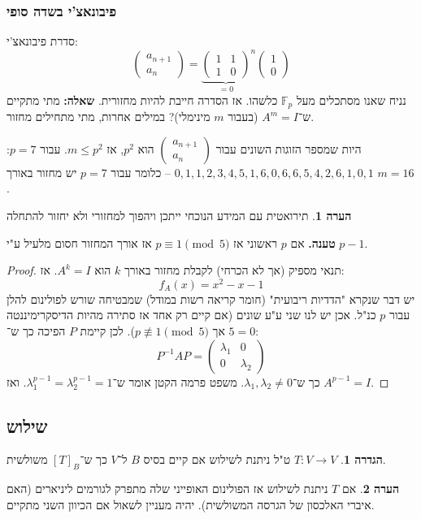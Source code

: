 \documentclass[a4paper]{article}
\newcommand\F         {\mathbb{F}}
\newcommand\co        {\colon}
\newcommand\pms[1]    {\begin{pmatrix}
		#1
\end{pmatrix}}
\renewcommand\lg      {\lambda}
\newcommand\op    {^{-1}}
\theoremstyle{definition}
\newtheorem{definition}{הגדרה}
\newtheorem{Remark}{הערה}
\newcommand\defi  [1] {\begin{definition}#1\end{definition}}
\newcommand\rmark [1] {\begin{Remark}#1\end{Remark}}
\begin{document}
	\subsubsection{פיבונאצ'י בשדה סופי}
	סדרת פיבונאצ'י: 
	\[ \pms{a_{n + 1} \\ a_n} = {\underbrace{\pms{1 & 1 \\ 1 & 0}}_{ = 0}}^{n}\pms{1 \\ 0} \]
	נניח שאנו מסתכלים מעל $\F_p$ כלשהו. אז הסדרה חייבת להיות מחזורית. \textbf{שאלה: }מתי מתקיים ש־$A^m = I$ (בעבור $m$ מינימלי)? במילים אחרות, מתי מתחילים מחזור. 
	
	היות שמספר הזוגות השונים עבור $\pms{a_{n + 1} \\ a_n}$ הוא $p^2$, אז $m \le p^2$. עבור $p = 7$: \hfill $0, 1, 1, 2, 3, 4, 5, 1, 6, 0, 6, 6, 5, 4, 2, 6, 1, 0, 1$ – כלומר עבור $p = 7$ יש מחזור באורך $m = 16$.
	\rmark{תירואטית עם המידע הנוכחי ייתכן ויהפוך למחזורי ולא יחזור להתחלה}
	
	\textbf{טענה. }אם $p$ ראשוני אז $p \equiv 1 \pmod 5$ אז אורך המחזור חסום מלעיל ע"י $p - 1$. 
	
	\begin{proof}
		תנאי מספיק (אך לא הכרחי) לקבלת מחזור באורך $k$ הוא $A^k = I$. אז: 
		\[ f_A(x) = x^2 - x - 1 \]
		יש דבר שנקרא "הדדיות ריבועית" (חומר קריאה רשות במודל) שמבטיחה שורש לפולינום להלן עבור $p$ כנ"ל. אכן יש לנו שני ע"ע שונים (אם קיים רק אחד אז סתירה מהיות הדיסקרימיננטה $5 = 0$ אך $p \not\equiv 1 \pmod 5$). לכן קיימת $P$ הפיכה כך ש־: 
		\[ P\op AP = \pms{\lg_1 & 0 \\ 0 & \lg_2} \]
		כך ש־$\lg_1, \lg_2 \neq 0$. משפט פרמה הקטן אומר ש־$\lg_1^{p - 1}  = \lg_2^{p - 1} = 1$. ואז $A^{p - 1} = I$. 
	\end{proof}
	
	\subsection{שילוש}
	\defi{$T \co V \to V$ ט"ל ניתנת לשילוש אם קיים בסיס $B$ ל־$V$ כך ש־$[T]_B$ משולשית. }
	
	\rmark{אם $T$ ניתנת לשילוש אז הפולינום האופייני שלה מתפרק לגורמים ליניארים (האם איברי האלכסון של הגרסה המשולשית). יהיה מעניין לשאול אם הכיוון השני מתקיים. }
	
\end{document}
